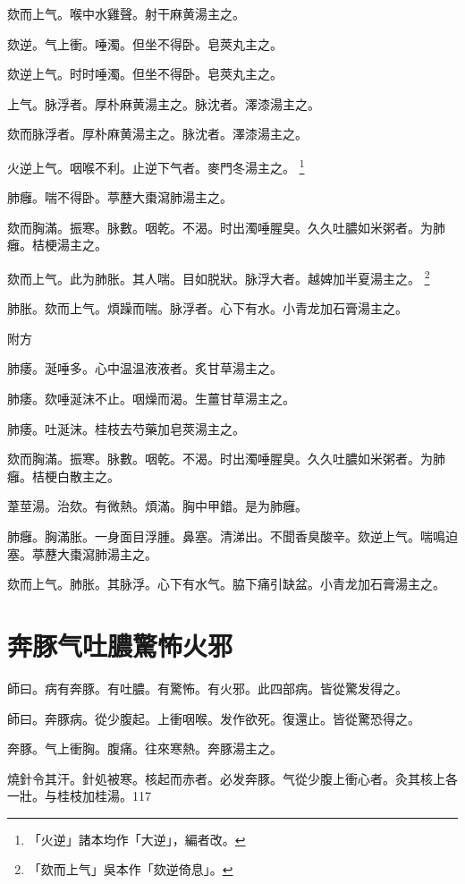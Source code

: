 欬而上气。喉中水雞聲。射干麻黄湯主之。

欬逆。气上衝。唾濁。但坐不得卧。皂莢丸主之。{\wuben}

欬逆上气。时时唾濁。但坐不得卧。皂莢丸主之。{\dengben}

上气。脉浮者。厚朴麻黄湯主之。脉沈者。澤漆湯主之。{\wuben}

欬而脉浮者。厚朴麻黄湯主之。脉沈者。澤漆湯主之。{\dengben}


火逆上气。咽喉不利。止逆下气者。麥門冬湯主之。
	\footnote{「火逆」諸本均作「大逆」，編者改。}

肺癰。喘不得卧。葶藶大棗瀉肺湯主之。

欬而胸滿。振寒。脉數。咽乾。不渴。时出濁唾腥臭。久久吐膿如米粥者。为肺癰。桔梗湯主之。

欬而上气。此为肺胀。其人喘。目如脱狀。脉浮大者。越婢加半夏湯主之。
	\footnote{「欬而上气」吳本作「欬逆倚息」。}

肺胀。欬而上气。煩躁而喘。脉浮者。心下有水。小青龙加石膏湯主之。

附方

肺痿。涎唾多。心中温温液液者。炙甘草湯主之。

肺痿。欬唾涎沫不止。咽燥而渴。生薑甘草湯主之。

肺痿。吐涎沫。桂枝去芍藥加皂莢湯主之。

欬而胸滿。振寒。脉數。咽乾。不渴。时出濁唾腥臭。久久吐膿如米粥者。为肺癰。桔梗白散主之。

葦莖湯。治欬。有微熱。煩滿。胸中甲錯。是为肺癰。

肺癰。胸滿胀。一身面目浮腫。鼻塞。清涕出。不聞香臭酸辛。欬逆上气。喘鳴迫塞。葶藶大棗瀉肺湯主之。

欬而上气。肺胀。其脉浮。心下有水气。脇下痛引缺盆。小青龙加石膏湯主之。

\chapter{奔豚气吐膿驚怖火邪}

師曰。病有奔豚。有吐膿。有驚怖。有火邪。此四部病。皆從驚发得之。

師曰。奔豚病。從少腹起。上衝咽喉。发作欲死。復還止。皆從驚恐得之。

奔豚。气上衝胸。腹痛。往來寒熱。奔豚湯主之。

燒針令其汗。針処被寒。核起而赤者。必发奔豚。气從少腹上衝心者。灸其核上各一壯。与桂枝加桂湯。117

